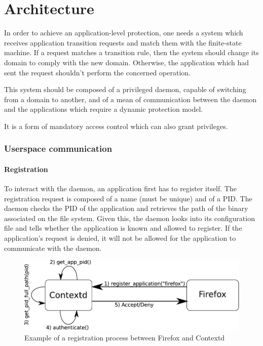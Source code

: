 \documentclass[conference]{IEEEtran}
\begin{document}
\section{Architecture}
		In order to achieve an application-level protection, one needs a system which receives application transition requests and  match them with the finite-state machine.
		If a request matches a transition rule, then the system should change its domain to comply with the new domain. 
		Otherwise, the application which had sent the request shouldn't perform the concerned operation. 

		This system should be composed of a privileged daemon, capable of switching from a domain to another, and of a
		mean of communication between the daemon and the applications which require a dynamic protection model.

		It is a form of mandatory access control which can also grant privileges.

		\subsubsection{Userspace communication}
			\paragraph{Registration} To interact with the daemon, an application first has to register itself. The registration request is composed of a name (must be unique) and of a PID. 
			The daemon checks the PID of the application and retrieves the path of the binary associated on the file system.
			Given this, the daemon looks into its configuration file and tells whether the application is known and allowed to register. If the application's request is denied,
			it will not be allowed for the application to communicate with the daemon.

			\begin{figure}[h!]
				\centering
				\includegraphics[scale=0.6]{app_authentication.pdf}
				\caption{Example of a registration process between Firefox and Contextd}
				\label{app_registration}
			\end{figure}
\end{document}
